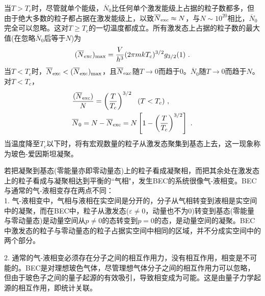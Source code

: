 \documentclass[12pt,a4paper]{article}
\begin{document}
当$T > T_c$时，尽管就单个能级，$\overline{N}_0$比任何单个激发能级上占据的粒子数都多，但由于绝大多数的粒子都占据在激发能级上，以致$\overline{N}_{\rm exc} \approx N$，与$N\sim 10^{20}$相比，$\overline{N}_0$完全可以忽略。这对$T \geqslant T_c$的一切温度都成立。所有激发态上占据的粒子数的最大值(在忽略$\overline{N}_0$后等于$N$)为
\begin{equation}
(\overline{N}_{\rm exc})_{\rm max} = \dfrac{V}{h^3} (2\pi m kT_c)^{3/2} g_{3/2}(1) ~. 
\end{equation}
当$T < T_c$时，$\overline{N}_{\rm exc} < (\overline{N}_{\rm exc})_{\rm max} $，且$\overline{N}_{\rm exc}$随$T \rightarrow 0$而趋于$0$。$\overline{N}_0$随$T \rightarrow 0$而趋于$N$。对$T < T_c$，
\begin{align}
& \dfrac{(\overline{N}_{\rm exc})}{N} = \left( \dfrac{T}{T_c} \right)^{3/2} ~~ (T < T_c) ~, \\
& \overline{N}_0 = N -\overline{N}_{\rm exc}  = N \left[1 - \left( \dfrac{T}{T_c} \right)^{3/2}\right] ~.
\end{align}
当温度降至$T_c$以下时，将有宏观数量的粒子从激发态聚集到基态上去，这一现象称为玻色-爱因斯坦凝聚。

若把凝聚到基态(零能量亦即零动量态)上的粒子看成凝聚相，而把其余处在激发态上的粒子看成与凝聚相达到平衡的``气相"，发生BEC的系统很像气-液相变。BEC与通常的气-液相变存在两点不同：\\
1. 气-液相变中，气相与液相在实空间是分开的，分子从气相转变到液相是实空间中的凝聚，而在BEC中，粒子从激发态($\varepsilon \neq 0$，动量也不为$0$)转变到基态(零能量与零动量态)是动量空间从$p \neq 0$的态转变到$p =0$的态，是动量空间的凝聚。BEC中激发态的粒子与零动量态的粒子占据实空间中相同的区域，并不分成实空间中的两个部分。

2. 通常的气-液相变必须存在分子之间的相互作用力，没有相互作用，相变是不可能的。BEC是对理想玻色气体，尽管理想气体分子之间的相互作用力可以忽略，但由于玻色子之间的量子起源的有效吸引，导致相变成为可能。这是由量子力学起源的相互作用，即统计关联。
\end{document}
